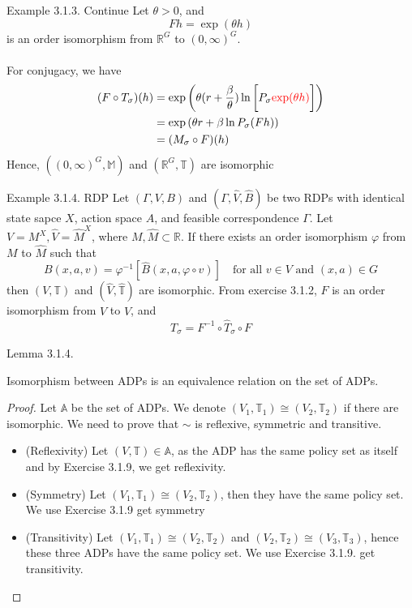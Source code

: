\begin{frame}{Example 3.1.3. Continue}
Let $\theta>0$, and 
$$
Fh = \exp(\theta h)
$$
is an order isomorphism from $\mathbb{R}^G$ to $(0,\infty)^G$.\\
\\
For conjugacy, we have
\begin{align*}
  (F\circ T_\sigma)(h) &= \exp\left(\theta (r+\frac{\beta}{\theta})\ln \bigg[P_\sigma \textcolor{red}{\exp(\theta h)}\bigg] \right)\\
  &= \exp\left(\theta r+\beta \ln P_\sigma (Fh) \right)\\
  &= (M_\sigma \circ F) (h)
\end{align*}
Hence, $((0,\infty)^G,\mathbb{M})$ and $(\mathbb{R}^G, \mathbb{T})$ are isomorphic
\end{frame}

\begin{frame}{Example 3.1.4. RDP}
Let $(\Gamma, V, B)$ and $(\Gamma, \hat V, \hat B)$ be two RDPs with identical state sapce $X$, action space $A$, and feasible correspondence $\Gamma$. Let $V = M^X,\hat V = \hat M^X$, where $M,\hat M\subset \mathbb{R}$. If there exists an order isomorphism $\varphi$ from $M$ to $\hat M$ such that
$$
B(x,a,v) = \varphi^{-1} [\hat B(x,a,\varphi\circ v)] \quad\text{for all $v\in V$ and $(x,a)\in G$}
$$
then $(V,\mathbb{T})$ and $(\hat V,\hat{\mathbb{T}})$ are isomorphic. From exercise 3.1.2, $F$ is an order isomorphism from $V$ to $\hat V$, and
$$
T_\sigma  = F^{-1} \circ \hat T_\sigma \circ F
$$
\end{frame}


\begin{frame}{Lemma 3.1.4.}
\begin{lemma}
    Isomorphism between ADPs is an equivalence relation on the set of ADPs.
\end{lemma}
\begin{proof}
    Let $\mathbb{A}$ be the set of ADPs. We denote $(V_1,\mathbb{T}_1)\cong(V_2, \mathbb{T}_2)$ if there are isomorphic. We need to prove that $\sim$ is reflexive, symmetric and transitive.
    \begin{itemize}
        \item (Reflexivity) Let $(V,\mathbb{T})\in \mathbb{A}$, as the ADP has the same policy set as itself and by Exercise 3.1.9, we get reflexivity.
        \item (Symmetry) Let $(V_1,\mathbb{T}_1)\cong(V_2, \mathbb{T}_2)$, then they have the same policy set. We use Exercise 3.1.9 get symmetry
        \item (Transitivity) Let $(V_1,\mathbb{T}_1)\cong(V_2, \mathbb{T}_2)$ and $(V_2,\mathbb{T}_2)\cong(V_3, \mathbb{T}_3)$, hence these three ADPs have the same policy set. We use Exercise 3.1.9. get transitivity.
    \end{itemize}
\end{proof}
\end{frame}